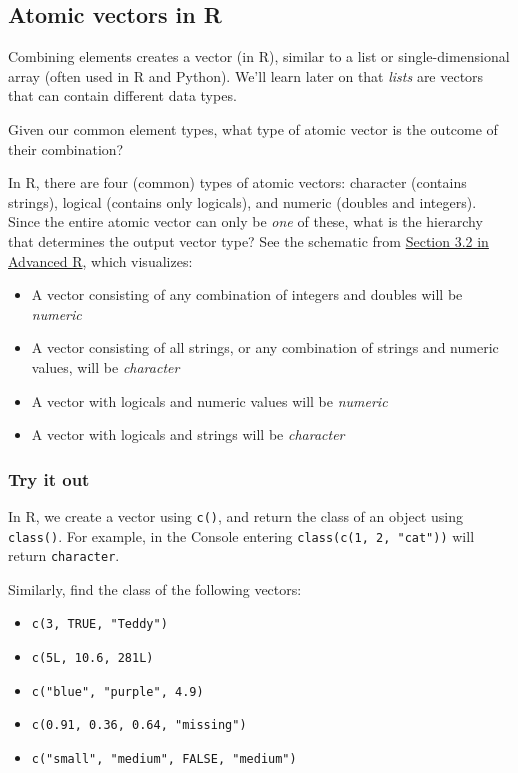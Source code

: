 \documentclass[
]{book}
\providecommand{\tightlist}{%
  \setlength{\itemsep}{0pt}\setlength{\parskip}{0pt}}
\begin{document}
\hypertarget{atomic-vectors-in-r}{%
\subsection{Atomic vectors in R}\label{atomic-vectors-in-r}}

Combining elements creates a vector (in R), similar to a list or single-dimensional array (often used in R and Python). We'll learn later on that \emph{lists} are vectors that can contain different data types.

Given our common element types, what type of atomic vector is the outcome of their combination?

In R, there are four (common) types of atomic vectors: character (contains strings), logical (contains only logicals), and numeric (doubles and integers). Since the entire atomic vector can only be \emph{one} of these, what is the hierarchy that determines the output vector type? See the schematic from \href{https://adv-r.hadley.nz/vectors-chap.html\#atomic-vectors}{Section 3.2 in Advanced R}, which visualizes:

\begin{itemize}
\tightlist
\item
  A vector consisting of any combination of integers and doubles will be \emph{numeric}
\item
  A vector consisting of all strings, or any combination of strings and numeric values, will be \emph{character}
\item
  A vector with logicals and numeric values will be \emph{numeric}
\item
  A vector with logicals and strings will be \emph{character}
\end{itemize}

\hypertarget{try-it-out}{%
\subsubsection{Try it out}\label{try-it-out}}

In R, we create a vector using \texttt{c()}, and return the class of an object using \texttt{class()}. For example, in the Console entering \texttt{class(c(1,\ 2,\ "cat"))} will return \texttt{character}.

Similarly, find the class of the following vectors:

\begin{itemize}
\tightlist
\item
  \texttt{c(3,\ TRUE,\ "Teddy")}
\item
  \texttt{c(5L,\ 10.6,\ 281L)}
\item
  \texttt{c("blue",\ "purple",\ 4.9)}
\item
  \texttt{c(0.91,\ 0.36,\ 0.64,\ "missing")}
\item
  \texttt{c("small",\ "medium",\ FALSE,\ "medium")}
\end{itemize}
\end{document}
